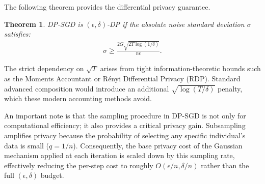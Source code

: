 \documentclass[11pt, a4paper]{article}
\newtheorem{theorem}{Theorem}
\begin{document}
The following theorem provides the differential privacy guarantee.
\begin{theorem}
    DP-SGD is $(\epsilon, \delta)$-DP if the absolute noise standard deviation $\sigma$ satisfies:
    \begin{align}
        \sigma \geq \frac{2G \sqrt{2T \log (1/\delta)}}{n\epsilon}.
    \end{align}
\end{theorem}
The strict dependency on $\sqrt{T}$ arises from tight information-theoretic bounds such as the Moments Accountant or R\'enyi Differential Privacy (RDP). Standard advanced composition would introduce an additional $\sqrt{\log(T/\delta)}$ penalty, which these modern accounting methods avoid.

An important note is that the sampling procedure in DP-SGD is not only for computational efficiency; it also provides a critical privacy gain. Subsampling amplifies privacy because the probability of selecting any specific individual's data is small ($q = 1/n$). Consequently, the base privacy cost of the Gaussian mechanism applied at each iteration is scaled down by this sampling rate, effectively reducing the per-step cost to roughly $O(\epsilon/n, \delta/n)$ rather than the full $(\epsilon, \delta)$ budget.
\end{document}
